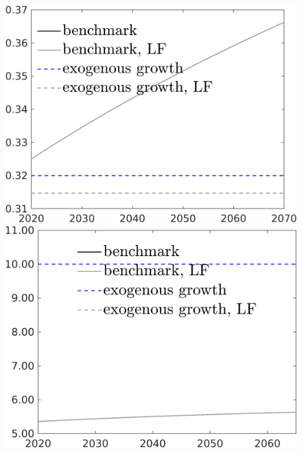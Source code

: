 \begin{figure}[h!!]
\begin{minipage}[]{0.32\textwidth}
 	\end{minipage}
 	\begin{minipage}[]{0.32\textwidth}
 		\includegraphics[width=1\textwidth]{../../codding_model/own_basedOnFried/optimalPol_190722_tidiedUp/figures/all_10Aout22/CountXgrTaulLF_target_pf_spillover0_sep1_extern0_PV1_etaa0.79_lgd1.png}
 	\end{minipage}
 	\begin{minipage}[]{0.32\textwidth}
 		\includegraphics[width=1\textwidth]{../../codding_model/own_basedOnFried/optimalPol_190722_tidiedUp/figures/all_10Aout22/CountXgrTaulLF_target_gAagg_spillover0_sep1_extern0_PV1_etaa0.79_lgd1.png}

\end{minipage}
\end{figure}
